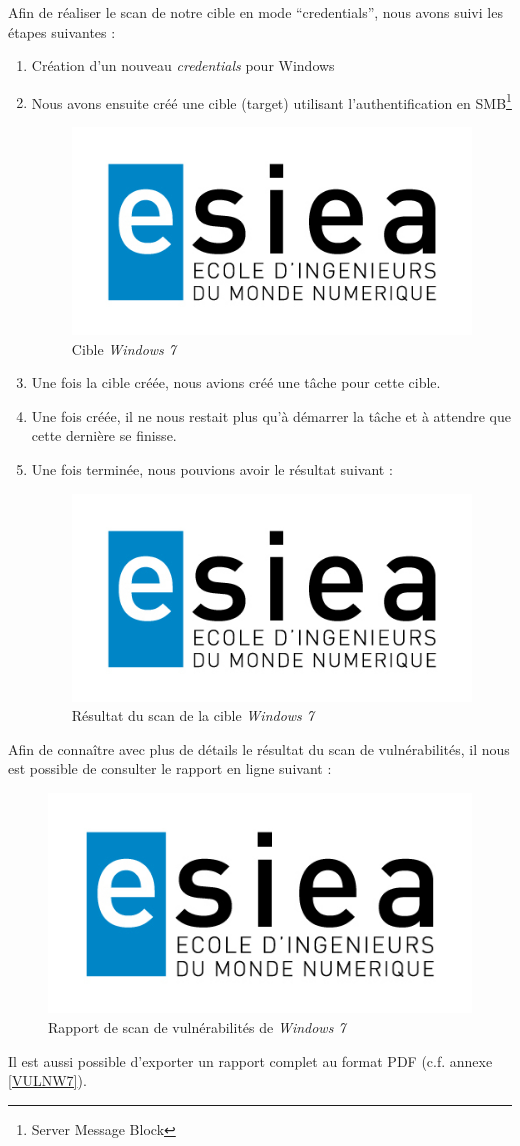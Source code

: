 Afin de réaliser le scan de notre cible en mode \enquote{credentials}, nous avons suivi les étapes suivantes :
\begin{enumerate}
 \item Création d'un nouveau \textit{credentials} pour Windows
 \item Nous avons ensuite créé une cible (target) utilisant l'authentification en SMB\footnote{Server Message Block\cite{SMB}}\\
 \begin{figure}[H]
    \centering
    \includegraphics[width=.7\textwidth]{img/esiea.jpeg}
    \caption{Cible \textit{Windows 7}}
 \end{figure}
 \item Une fois la cible créée, nous avions créé une tâche pour cette cible.
 \item Une fois créée, il ne nous restait plus qu'à démarrer la tâche et à attendre que cette dernière se finisse.
 \item Une fois terminée, nous pouvions avoir le résultat suivant :
 \begin{figure}[H]
    \centering
    \includegraphics[width=.7\textwidth]{img/esiea.jpeg}
    \caption{Résultat du scan de la cible \textit{Windows 7}}
 \end{figure}
\end{enumerate}
Afin de connaître avec plus de détails le résultat du scan de vulnérabilités, il nous est possible de consulter le rapport en ligne suivant :
\begin{figure}[H]
    \centering
    \includegraphics[width=.7\textwidth]{img/esiea.jpeg}
    \caption{Rapport de scan de vulnérabilités de \textit{Windows 7}}
\end{figure}
Il est aussi possible d'exporter un rapport complet au format PDF (c.f. annexe \ref{VULNW7}).

